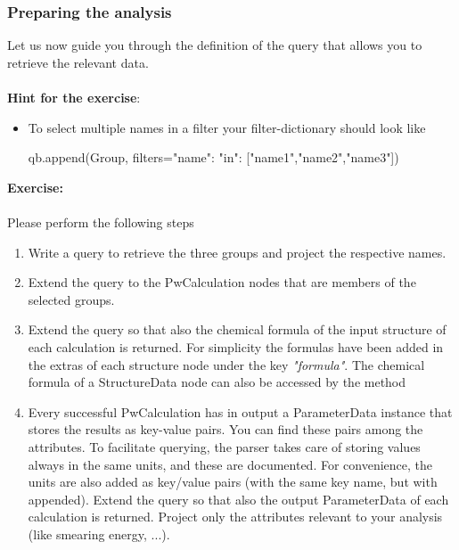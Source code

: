 \subsubsection*{Preparing the analysis}
Let us now guide you through the definition of the query that allows you to retrieve the relevant data.\\~\\
\textbf{Hint for the exercise}:
\begin{itemize}
\item To select multiple names in a filter your filter-dictionary should look like
\begin{pythoncommand}
qb.append(Group, filters={"name": {"in": ["name1","name2","name3"]}})
\end{pythoncommand}
\end{itemize}

\begin{tcolorbox}
\textbf{Exercise:}\\~\\
Please perform the following steps
\begin{enumerate}
\item Write a query to retrieve the three groups and project the respective names.
\item Extend the query to the PwCalculation nodes that are members of the selected groups.
\item Extend the query so that also the chemical formula of the input structure of each calculation is returned.
For simplicity the formulas have been added in the extras of each structure node under the key \textit{"formula"}.
The chemical formula of a StructureData node can also be accessed by the method 
\item Every successful PwCalculation has in output a ParameterData instance that stores the results as key-value pairs.
You can find these pairs among the attributes.
To facilitate querying, the parser takes care of storing values always in the same units, and these are documented.
For convenience, the units are also added as key/value pairs (with the same key name, but with   appended).
Extend the query so that also the output ParameterData of each calculation is returned.
Project only the attributes relevant to your analysis (like smearing energy, ...).
\end{enumerate}
\end{tcolorbox}

